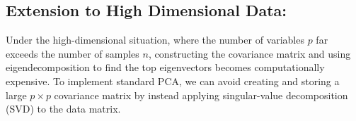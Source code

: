 \documentclass[12pt]{article}
\begin{document}



\subsection{Extension to High Dimensional Data:}

Under the high-dimensional situation, where the number of variables $p$ far exceeds the number of samples $n$, constructing the covariance matrix and using eigendecomposition to find the top eigenvectors becomes computationally expensive. To implement standard PCA, we can avoid creating and storing a large $p \times p$ covariance matrix by instead applying singular-value decomposition (SVD) to the data matrix.
\end{document}
